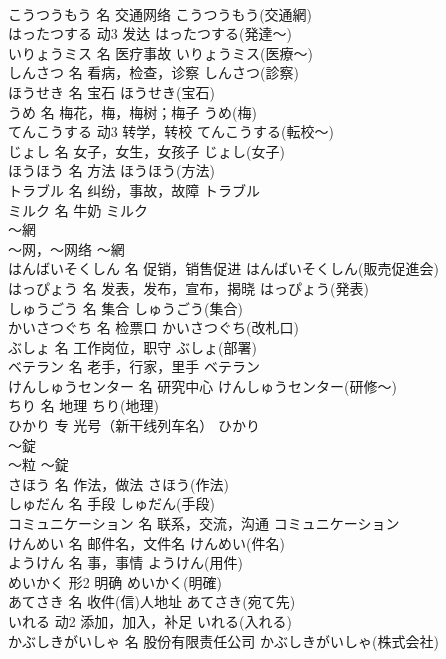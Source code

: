 \documentclass[8pt]{extreport}
\begin{document}
\begin{CJK}{UTF8}{min}
\\	こうつうもう	名	交通网络	こうつうもう(交通網)	
\\	はったつする	动3	发达	はったつする(発達～)	
\\	いりょうミス	名	医疗事故	いりょうミス(医療～)	
\\	しんさつ	名	看病，检查，诊察	しんさつ(診察)	
\\	ほうせき	名	宝石	ほうせき(宝石)	
\\	うめ	名	梅花，梅，梅树；梅子	うめ(梅)	
\\	てんこうする	动3	转学，转校	てんこうする(転校～)	
\\	じょし	名	女子，女生，女孩子	じょし(女子)	
\\	ほうほう	名	方法	ほうほう(方法)	
\\	トラブル	名	纠纷，事故，故障	トラブル	
\\	ミルク	名	牛奶	ミルク	
\\	～網	
\\	～网，～网络	～網	
\\	はんばいそくしん	名	促销，销售促进	はんばいそくしん(販売促進会)	
\\	はっぴょう	名	发表，发布，宣布，揭晓	はっぴょう(発表)	
\\	しゅうごう	名	集合	しゅうごう(集合)	
\\	かいさつぐち	名	检票口	かいさつぐち(改札口)	
\\	ぶしょ	名	工作岗位，职守	ぶしょ(部署)	
\\	ベテラン	名	老手，行家，里手	ベテラン	
\\	けんしゅうセンター	名	研究中心	けんしゅうセンター(研修～)	
\\	ちり	名	地理	ちり(地理)	
\\	ひかり	专	光号（新干线列车名）	ひかり	
\\	～錠	
\\	～粒	～錠	
\\	さほう	名	作法，做法	さほう(作法)	
\\	しゅだん	名	手段	しゅだん(手段)	
\\	コミュニケーション	名	联系，交流，沟通	コミュニケーション	
\\	けんめい	名	邮件名，文件名	けんめい(件名)	
\\	ようけん	名	事，事情	ようけん(用件)	
\\	めいかく	形2	明确	めいかく(明確)	
\\	あてさき	名	收件(信)人地址	あてさき(宛て先)	
\\	いれる	动2	添加，加入，补足	いれる(入れる)	
\\	かぶしきがいしゃ	名	股份有限责任公司	かぶしきがいしゃ(株式会社)	

\end{CJK}
\end{document}
